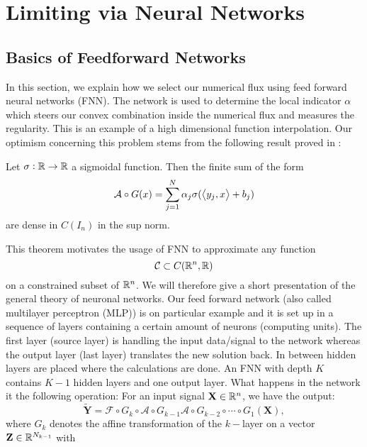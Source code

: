 \section{Limiting via Neural Networks} \label{se_neunet}

\subsection{Basics of Feedforward Networks}

In this section, we explain how we select our numerical flux using  feed forward neural networks (FNN).
The network is used to determine the local  indicator $\alpha$ which 
steers our convex combination inside the numerical flux and measures the regularity. This is an example of 
a high dimensional function interpolation. Our optimism concerning this problem stems from the following result proved in \cite{Cybenko1989}:
\begin{theorem}
	Let $\sigma: \mathbb{R} \to \mathbb{R}$ a sigmoidal function. Then the finite sum of the form
	\[
			\mathcal A \circ G(x) = \sum_{j=1}^N \alpha_j \sigma(\left\langle{y_j, x}\right\rangle + b_j)
	\]
	are dense in $C(I_n)$ in the sup norm.
\end{theorem}
This theorem motivates the usage of FNN to approximate any function 
\begin{equation}
\mathcal C \subset C(\mathbb{R}^n, \mathbb{R})
\label{eq:function_network}
\end{equation}
 on a constrained subset of $\mathbb{R}^n$. We will therefore give a short presentation of the general theory of neuronal networks.
Our feed forward network (also called 
multilayer perceptron (MLP)) is on particular example and it is set up in a sequence of layers containing a certain amount of neurons (computing units). 
The first layer (source layer) is handling the input data/signal to the network whereas the output layer (last layer) translates the new solution back. 
In between hidden layers are placed where the calculations are done. An FNN  with depth $K$ contains $K-1$ hidden layers and one output layer.
What happens in the network it the following operation: For an input signal $\mathbf{X} \in \mathbb{R}^n$, we have the output:
\begin{equation}\label{eq_function_network_2}
\mathbf{\tilde{Y}} = \mathcal{F} \circ G_k \circ \mathcal{A} \circ G_{k-1} \mathcal{A} \circ G_{k-2} \circ \cdots \circ G_1(\mathbf{X}) ,
\end{equation}
where $G_k$ denotes the affine transformation of the $k-$layer on a vector $\mathbf{Z}\in \mathbb{R}^{N_{k-1}}$ with 
